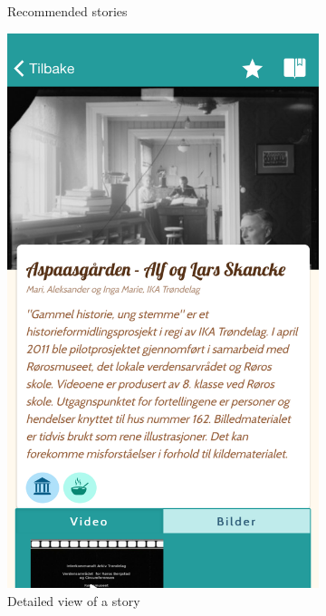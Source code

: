 \begin{appendices}
\begin{figure}[h!]
\begin{subfigure}[h]{0.32\textwidth}
			\caption{Recommended stories}
		\end{subfigure}
		\begin{subfigure}[h]{0.32\textwidth}
			\includegraphics[width=\textwidth]{fig/screenshot_story}
			\caption{Detailed view of a story}
		\end{subfigure}
		\begin{subfigure}[h]{0.32\textwidth}

\end{subfigure}
\end{figure}
\end{appendices}
